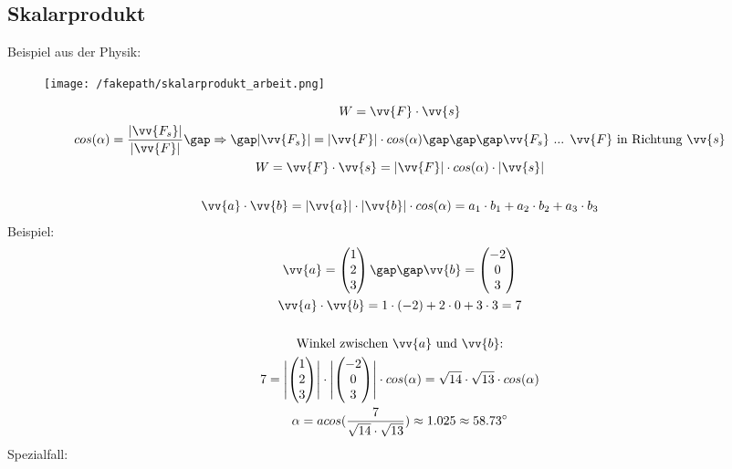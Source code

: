 \subsection{Skalarprodukt}
Beispiel aus der Physik:
\begin{figure}[H]
  \centering
  \texttt{[image: /fakepath/skalarprodukt\_arbeit.png]}
\end{figure}
\begin{gather*}
  W = \vv{F} \cdot \vv{s} \\
  cos(\alpha) = \frac{|\vv{F_s}|}{|\vv{F}|} \gap\Rightarrow\gap |\vv{F_s}| = |\vv{F}| \cdot cos(\alpha) \gap\gap\gap \text{$\vv{F_s}$ ... $\vv{F}$ in Richtung $\vv{s}$} \\
  W = \vv{F} \cdot \vv{s} = |\vv{F}| \cdot cos(\alpha) \cdot |\vv{s}| \\\\
  \vv{a} \cdot \vv{b} = |\vv{a}| \cdot |\vv{b}| \cdot cos(\alpha) = a_1 \cdot b_1 + a_2 \cdot b_2 + a_3 \cdot b_3 \\
\end{gather*}
Beispiel:
\begin{gather*}
  \vv{a} = \begin{pmatrix}1 \\ 2 \\ 3\end{pmatrix} \gap\gap \vv{b} = \begin{pmatrix}-2 \\ 0 \\ 3\end{pmatrix} \\
  \vv{a} \cdot \vv{b} = 1 \cdot (-2) + 2 \cdot 0 + 3 \cdot 3 = 7 \\\\
  \text{Winkel zwischen $\vv{a}$ und $\vv{b}$:} \\
  7 = \Biggl|\begin{pmatrix}1 \\ 2 \\ 3\end{pmatrix}\Biggr| \cdot \Biggl|\begin{pmatrix}-2 \\ 0 \\ 3\end{pmatrix}\Biggr| \cdot cos(\alpha) = \sqrt{14} \cdot \sqrt{13} \cdot cos(\alpha) \\
  \alpha = acos(\frac{7}{\sqrt{14} \cdot \sqrt{13}}) \approx 1.025 \approx 58.73^\circ
\end{gather*}
Spezialfall:
